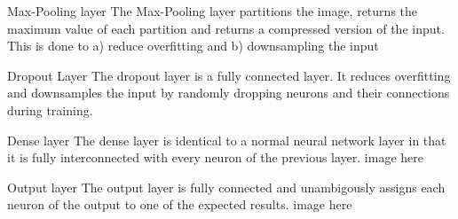 \documentclass[12pt]{beamer}
\begin{document}
\begin{frame}{Max-Pooling layer}
The Max-Pooling layer partitions the image, returns the maximum value of each partition   and returns a compressed version of the input. This is done to a) reduce overfitting and b) downsampling the input


\end{frame}
\begin{frame}{Dropout Layer}
The dropout layer is a fully connected layer. It reduces overfitting and downsamples the input by randomly dropping neurons and their connections during training. 

\end{frame}
\begin{frame}{Dense layer}
The dense layer is identical to a normal neural network layer in that it is fully interconnected with every neuron of the previous layer.
\linebreak
image here
\end{frame}

\begin{frame}{Output layer}
The output layer is fully connected and unambigously assigns each neuron of the output to one of the expected results.
\linebreak
image here
\end{frame}
\end{document}
